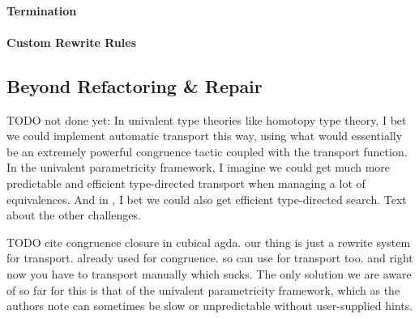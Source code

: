 \paragraph{Termination}

\paragraph{Custom Rewrite Rules}

\subsection{Beyond Refactoring \& Repair}
\label{sec:beyond}

TODO not done yet: In univalent type theories like homotopy type theory, I bet we could implement automatic transport this way, using what would essentially be an extremely powerful congruence tactic coupled with the transport function. In the univalent parametricity framework, I imagine we could get much more predictable and efficient type-directed transport when managing a lot of equivalences. And in \toolname, I bet we could also get efficient type-directed search. Text about the other challenges.

TODO cite congruence closure in cubical agda. our thing is just a rewrite system for transport. already used for congruence. so can use for transport too.
and right now you have to transport manually which sucks.
The only solution we are aware of so far for this is that of the univalent parametricity framework,
which as the authors note can sometimes be slow or unpredictable without user-supplied hints.


